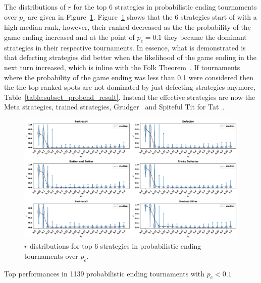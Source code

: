 \documentclass{article}
\begin{document}
The distributions of \(r\) for the top 6 strategies in probabilistic ending
tournaments over \(p_e\) are given in Figure~\ref{fig:effect_of_probend}.
Figure~\ref{fig:effect_of_probend} shows that the 6 strategies start of with a
high median rank, however, their ranked decreased as the the probability of the
game ending increased and at the point of \(p_e=0.1\) they became the dominant
strategies in their respective tournaments. In essence, what is demonstrated is
that defecting strategies did better when the likelihood of the game ending in
the next turn increased, which is inline with the Folk
Theorem~\cite{Fudenberg2009}. If tournaments where the probability of the game
ending was less than 0.1 were considered then the the top ranked spots are not
dominated by just defecting strategies anymore,
Table~\ref{table:subset_probend_result}. Instead the effective strategies are
now the Meta strategies, trained strategies, Grudger~\cite{axelrodproject} and
Spiteful Tit for Tat~\cite{prison}.

\begin{figure}[!htbp]
    \centering
    \includegraphics[width=\textwidth]{../images/folk_theorem.pdf}
    \caption{\(r\) distributions for top 6 strategies in probabilistic ending tournaments
    over $p_e$.}
    \label{fig:effect_of_probend}
\end{figure}

\begin{table}[!htbp]
    \centering
    \resizebox{.30\textwidth}{!}{
    }
    \caption{Top performances in 1139 probabilistic ending tournaments with \(p_e < 0.1\)}
    \label{table:subset_probend_result}
\end{table}
\end{document}
